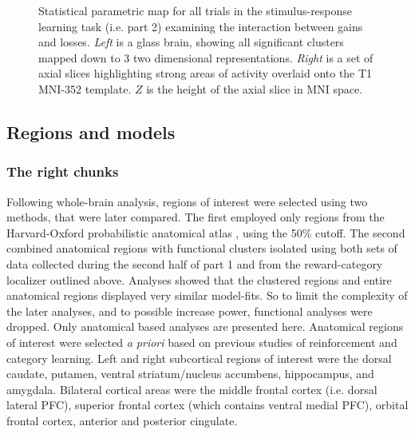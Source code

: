 \documentclass[doc,12pt]{apa}        %
\begin{document}
\begin{figure}[tp]
    \centering
	\caption{Statistical parametric map for all trials in the stimulus-response learning task (i.e. part 2) examining the interaction between gains and losses.  \emph{Left} is a glass brain, showing all significant clusters mapped down to 3 two dimensional representations.  \emph{Right} is a set of axial slices highlighting strong areas of activity overlaid onto the T1 MNI-352 template.  $Z$ is the height of the axial slice in MNI space.}
	\label{fig:gxl}
\end{figure}

\subsection{Regions and models}
\label{sub:regoins}
\subsubsection{The right chunks}
\label{subsub:chunks}
Following whole-brain analysis, regions of interest were selected using two methods, that were later compared.  The first employed only regions from the Harvard-Oxford probabilistic anatomical atlas \cite{Desikan:2006p9370}, using the 50\% cutoff.  The second combined anatomical regions with functional clusters isolated using both sets of data collected during the second half of part 1 and from the reward-category localizer outlined above.  Analyses showed that the clustered regions and entire anatomical regions displayed very similar model-fits.  So to limit the complexity of the later analyses, and to possible increase power, functional analyses were dropped.  Only anatomical based analyses are presented here.  Anatomical regions of interest were selected \emph{a priori} based on previous studies of reinforcement and category learning.  Left and right subcortical regions of interest were the dorsal caudate, putamen, ventral striatum/nucleus accumbens, hippocampus, and amygdala.   Bilateral cortical areas were the middle frontal cortex (i.e. dorsal lateral PFC), superior frontal cortex (which contains ventral medial PFC), orbital frontal cortex, anterior and posterior cingulate.
\end{document}
